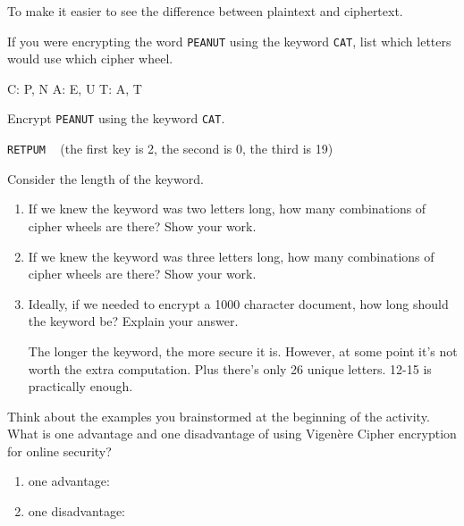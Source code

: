 \begin{answer}
To make it easier to see the difference between plaintext and ciphertext.
\end{answer}


\Q If you were encrypting the word \texttt{PEANUT} using the keyword \texttt{CAT}, list which letters would use which cipher wheel.

\begin{answer}[3em]
\centering
C: P, N
\hspace{3em}
A: E, U
\hspace{3em}
T: A, T
\end{answer}


\Q Encrypt \texttt{PEANUT} using the keyword \texttt{CAT}.

\begin{answer}[3em]
\texttt{RETPUM} ~ (the first key is 2, the second is 0, the third is 19)
\end{answer}


\Q Consider the length of the keyword.

\begin{enumerate}

\item If we knew the keyword was two letters long, how many combinations of cipher wheels are there?
Show your work.


\item If we knew the keyword was three letters long, how many combinations of cipher wheels are there?
Show your work.


\item Ideally, if we needed to encrypt a 1000 character document, how long should the keyword be?
Explain your answer.

\begin{answer}
The longer the keyword, the more secure it is.
However, at some point it's not worth the extra computation.
Plus there's only 26 unique letters. 12-15 is practically enough.
\end{answer}

\end{enumerate}


\Q Think about the examples you brainstormed at the beginning of the activity.
What is one advantage and one disadvantage of using Vigenère Cipher encryption for online security?

\begin{enumerate}

\item one advantage:


\item one disadvantage:


\end{enumerate}
